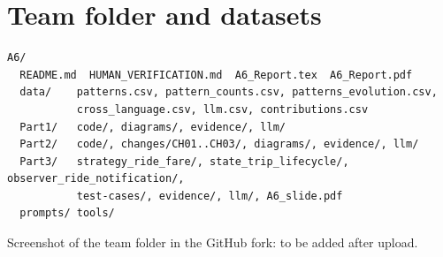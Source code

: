 \documentclass[11pt,a4paper]{article}
\begin{document}
\section{Team folder and datasets}
\begin{verbatim}
A6/
  README.md  HUMAN_VERIFICATION.md  A6_Report.tex  A6_Report.pdf
  data/    patterns.csv, pattern_counts.csv, patterns_evolution.csv,
           cross_language.csv, llm.csv, contributions.csv
  Part1/   code/, diagrams/, evidence/, llm/
  Part2/   code/, changes/CH01..CH03/, diagrams/, evidence/, llm/
  Part3/   strategy_ride_fare/, state_trip_lifecycle/, observer_ride_notification/,
           test-cases/, evidence/, llm/, A6_slide.pdf
  prompts/ tools/
\end{verbatim}
Screenshot of the team folder in the GitHub fork: to be added after upload.
\end{document}
